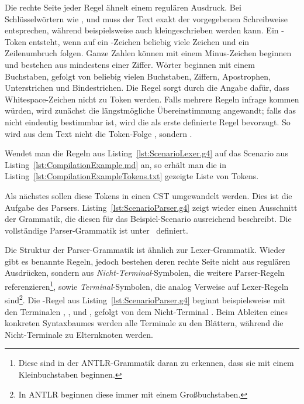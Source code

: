 Die rechte Seite jeder Regel ähnelt einem regulären Ausdruck.
Bei Schlüsselwörtern wie ,  und  muss der Text exakt der vorgegebenen Schreibweise entsprechen, während  beispielsweise auch kleingeschrieben werden kann.
Ein -Token entsteht, wenn auf ein \code{#}-Zeichen beliebig viele Zeichen und ein Zeilenumbruch folgen.
Ganze Zahlen können mit einem Minus-Zeichen beginnen und bestehen aus mindestens einer Ziffer.
Wörter beginnen mit einem Buchstaben, gefolgt von beliebig vielen Buchstaben, Ziffern, Apostrophen, Unterstrichen und Bindestrichen.
Die Regel  sorgt durch die Angabe  dafür, dass Whitespace-Zeichen nicht zu Token werden.
Falls mehrere Regeln infrage kommen würden, wird zunächst die längstmögliche Übereinstimmung angewandt;
falls das nicht eindeutig bestimmbar ist, wird die als erste definierte Regel bevorzugt.
So wird aus dem Text  nicht die Token-Folge , sondern .

Wendet man die Regeln aus Listing~\ref{lst:ScenarioLexer.g4} auf das Scenario aus Listing~\ref{lst:CompilationExample.md} an,
so erhält man die in Listing~\ref{lst:CompilationExampleTokens.txt} gezeigte Liste von Tokens.


Als nächstes sollen diese Tokens in einen CST umgewandelt werden.
Dies ist die Aufgabe des Parsers.
Listing~\ref{lst:ScenarioParser.g4} zeigt wieder einen Ausschnitt der Grammatik, die diesen für das Beispiel-Scenario ausreichend beschreibt.
Die vollständige Parser-Grammatik ist unter~\cite{parser-grammar} definiert.


Die Struktur der Parser-Grammatik ist ähnlich zur Lexer-Grammatik.
Wieder gibt es benannte Regeln, jedoch bestehen deren rechte Seite nicht aus regulären Ausdrücken,
sondern aus \emph{Nicht-Terminal}-Symbolen, die weitere Parser-Regeln referenzieren\footnote{Diese sind in der ANTLR-Grammatik daran zu erkennen, dass sie mit einem Kleinbuchstaben beginnen.},
sowie \emph{Terminal}-Symbolen, die analog Verweise auf Lexer-Regeln sind\footnote{In ANTLR beginnen diese immer mit einem Großbuchstaben.}.
Die -Regel aus Listing~\ref{lst:ScenarioParser.g4} beginnt beispielsweise mit den Terminalen , ,  und , gefolgt von dem Nicht-Terminal .
Beim Ableiten eines konkreten Syntaxbaumes werden alle Terminale zu den Blättern, während die Nicht-Terminale zu Elternknoten werden.

